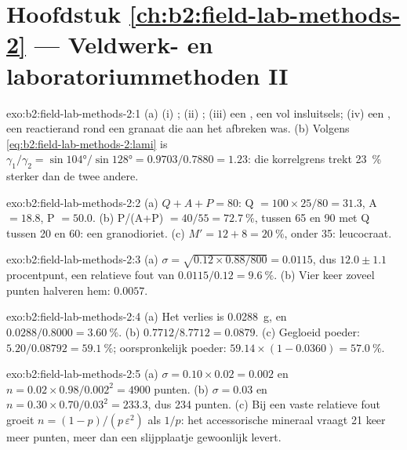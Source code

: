 \section*{Hoofdstuk \ref{ch:b2:field-lab-methods-2} --- Veldwerk- en laboratoriummethoden II}

\begin{solution}{exo:b2:field-lab-methods-2:1}
(a) (i) ; (ii) ; (iii) een , een  vol
insluitsels; (iv) een , een reactierand rond een granaat die aan het afbreken was. (b) Volgens
\eqref{eq:b2:field-lab-methods-2:lami} is $\gamma_1/\gamma_2 = \sin\ang{104}/\sin\ang{128} =
0.9703/0.7880 = 1.23$: die korrelgrens trekt \qty{23}{\percent} sterker dan de twee andere.
\end{solution}

\begin{solution}{exo:b2:field-lab-methods-2:2}
(a) $Q + A + P = 80$: Q $= 100 \times 25/80 = 31.3$, A $= 18.8$, P $= 50.0$. (b) P/(A+P) $=
40/55 = \qty{72.7}{\percent}$, tussen 65 en 90 met Q tussen 20 en 60: een granodioriet.
(c) $M' = 12 + 8 = \qty{20}{\percent}$, onder 35: leucocraat.
\end{solution}

\begin{solution}{exo:b2:field-lab-methods-2:3}
(a) $\sigma = \sqrt{0.12 \times 0.88/800} = 0.0115$, dus $12.0 \pm 1.1$ procentpunt, een
relatieve fout van $0.0115/0.12 = \qty{9.6}{\percent}$. (b) Vier keer zoveel punten halveren hem: $0.0057$.
\end{solution}

\begin{solution}{exo:b2:field-lab-methods-2:4}
(a) Het verlies is \qty{0.0288}{g}, en $0.0288/0.8000 = \qty{3.60}{\percent}$.
(b) $0.7712/8.7712 = 0.0879$.
(c) Gegloeid poeder: $5.20/0.08792 = \qty{59.1}{\percent}$; oorspronkelijk poeder:
$59.14 \times (1 - 0.0360) = \qty{57.0}{\percent}$.
\end{solution}

\begin{solution}{exo:b2:field-lab-methods-2:5}
(a) $\sigma = 0.10 \times 0.02 = 0.002$ en $n = 0.02 \times 0.98/0.002^2 = 4900$ punten.
(b) $\sigma = 0.03$ en $n = 0.30 \times 0.70/0.03^2 = 233.3$, dus 234 punten. (c) Bij een vaste relatieve
fout groeit $n = (1-p)/(p\,\varepsilon^2)$ als $1/p$: het accessorische mineraal vraagt 21 keer meer
punten, meer dan een slijpplaatje gewoonlijk levert.
\end{solution}

